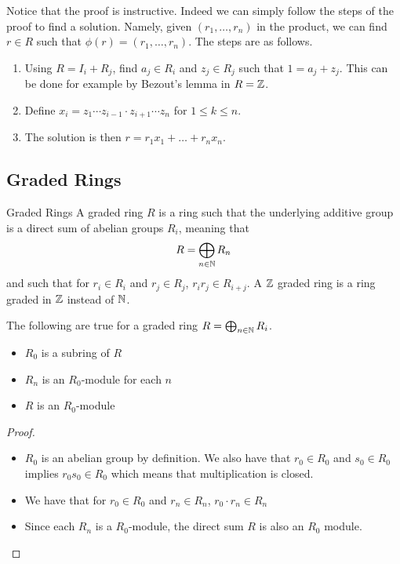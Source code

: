 \documentclass[a4paper]{article}
\begin{document}
Notice that the proof is instructive. Indeed we can simply follow the steps of the proof to find a solution. Namely, given $(r_1,\dots,r_n)$ in the product, we can find $r\in R$ such that $\phi(r)=(r_1,\dots,r_n)$. The steps are as follows. 
\begin{enumerate}
\item Using $R=I_i+R_j$, find $a_j\in R_i$ and $z_j\in R_j$ such that $1=a_j+z_j$. This can be done for example by Bezout's lemma in $R=\mathbb{Z}$. 
\item Define $x_i=z_1\cdots z_{i-1}\cdot z_{i+1}\cdots z_n$ for $1\leq k\leq n$. 
\item The solution is then $r=r_1x_1+\dots+r_nx_n$. 
\end{enumerate}

\subsection{Graded Rings}
\begin{defn}{Graded Rings}{} A graded ring $R$ is a ring such that the underlying additive group is a direct sum of abelian groups $R_i$, meaning that $$R=\bigoplus_{n\in\mathbb{N}}R_n$$ and such that for $r_i\in R_i$ and $r_j\in R_j$, $r_ir_j\in R_{i+j}$. A $\mathbb{Z}$ graded ring is a ring graded in $\mathbb{Z}$ instead of $\mathbb{N}$. 
\end{defn}

\begin{prp}{}{} The following are true for a graded ring $R=\bigoplus_{n\in\mathbb{N}}R_i$. 
\begin{itemize}
\item $R_0$ is a subring of $R$
\item $R_n$ is an $R_0$-module for each $n$
\item $R$ is an $R_0$-module
\end{itemize} \tcbline
\begin{proof}~\\
\begin{itemize}
\item $R_0$ is an abelian group by definition. We also have that $r_0\in R_0$ and $s_0\in R_0$ implies $r_0s_0\in R_0$ which means that multiplication is closed. 
\item We have that for $r_0\in R_0$ and $r_n\in R_n$, $r_0\cdot r_n\in R_n$
\item Since each $R_n$ is a $R_0$-module, the direct sum $R$ is also an $R_0$ module. 
\end{itemize}
\end{proof}
\end{prp}
\end{document}

